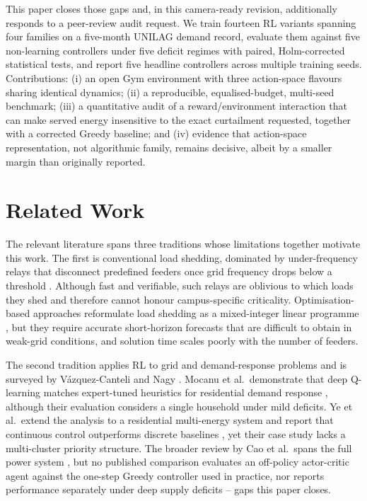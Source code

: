 \documentclass[9pt,conference]{IEEEtran}
\begin{document}
This paper closes those gaps and, in this camera-ready revision, additionally responds to a peer-review audit request. We train fourteen RL variants spanning four families on a five-month UNILAG demand record, evaluate them against five non-learning controllers under five deficit regimes with paired, Holm-corrected statistical tests, and report five headline controllers across multiple training seeds. Contributions: (i) an open Gym environment with three action-space flavours sharing identical dynamics; (ii) a reproducible, equalised-budget, multi-seed benchmark; (iii) a quantitative audit of a reward/environment interaction that can make served energy insensitive to the exact curtailment requested, together with a corrected Greedy baseline; and (iv) evidence that action-space representation, not algorithmic family, remains decisive, albeit by a smaller margin than originally reported.

\section{Related Work}
The relevant literature spans three traditions whose limitations together motivate this work. The first is conventional load shedding, dominated by under-frequency relays that disconnect predefined feeders once grid frequency drops below a threshold \cite{anderson1992}. Although fast and verifiable, such relays are oblivious to which loads they shed and therefore cannot honour campus-specific criticality. Optimisation-based approaches reformulate load shedding as a mixed-integer linear programme \cite{carrion2006}, but they require accurate short-horizon forecasts that are difficult to obtain in weak-grid conditions, and solution time scales poorly with the number of feeders.

The second tradition applies RL to grid and demand-response problems and is surveyed by V\'azquez-Canteli and Nagy \cite{vazquezcanteli2019}. Mocanu et al.\ demonstrate that deep Q-learning matches expert-tuned heuristics for residential demand response \cite{mocanu2019}, although their evaluation considers a single household under mild deficits. Ye et al.\ extend the analysis to a residential multi-energy system and report that continuous control outperforms discrete baselines \cite{ye2020}, yet their case study lacks a multi-cluster priority structure. The broader review by Cao et al.\ spans the full power system \cite{cao2020}, but no published comparison evaluates an off-policy actor-critic agent against the one-step Greedy controller used in practice, nor reports performance separately under deep supply deficits -- gaps this paper closes.
\end{document}
